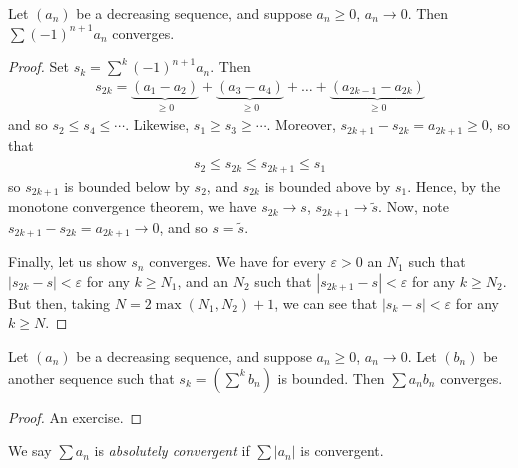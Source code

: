 \documentclass{../../template/note}
\begin{document}
    
    \begin{proposition}
        Let \((a_n)\) be a decreasing sequence, and suppose \(a_n \geq 0\), \(a_n \to 0\). Then \(\sum (-1)^{n+1}a_n\) converges.
    \end{proposition}
    

    \begin{proof}
        Set \(s_k = \sum^k (-1)^{n+1} a_n\). Then
        \begin{align*}
            s_{2k} = \underbrace{(a_1 - a_2)}_{\geq 0} + \underbrace{(a_3 - a_4)}_{\geq 0} + \dots + \underbrace{(a_{2k-1} - a_{2k})}_{\geq 0}
        \end{align*}
        and so \(s_2 \leq s_4 \leq \cdots\). Likewise, \(s_1 \geq s_3 \geq \cdots\). Moreover, \(s_{2k+1} - s_{2k} = a_{2k+1} \geq 0\), so that
        \begin{align*}
            s_2 \leq s_{2k} \leq s_{2k+1} \leq s_1
        \end{align*}
        so \(s_{2k+1}\) is bounded below by \(s_2\), and \(s_{2k}\) is bounded above by \(s_1\). Hence, by the monotone convergence theorem, we have \(s_{2k} \to s\), \(s_{2k+1} \to \tilde s\). Now, note \(s_{2k+1}-s_{2k} = a_{2k+1} \to 0\), and so \(s = \tilde s\).

        Finally, let us show \(s_n\) converges. We have for every \(\varepsilon > 0\) an \(N_1\) such that \(|s_{2k}-s| < \varepsilon\) for any \(k \geq N_1\), and an \(N_2\) such that \(|s_{2k+1}-s| < \varepsilon\) for any \(k \geq N_2\). But then, taking \(N = 2\max(N_1, N_2)+1\), we can see that \(|s_k - s| < \varepsilon\) for any \(k \geq N\).
    \end{proof}
    
    \begin{proposition}
        Let \((a_n)\) be a decreasing sequence, and suppose \(a_n \geq 0\), \(a_n \to 0\). Let \((b_n)\) be another sequence such that \(s_k = (\sum^k b_n)\) is bounded. Then \(\sum a_nb_n\) converges.
    \end{proposition}
    
    \begin{proof}
        An exercise.
    \end{proof}
    
    \begin{definition}
        We say \(\sum a_n\) is \emph{absolutely convergent} if \(\sum |a_n|\) is convergent.
    \end{definition}
    
\end{document}
